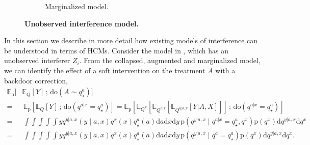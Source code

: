\documentclass[12pt]{article}
\newcommand{\rmdo}{\mathrm{do}}
\newcommand{\s}{\, ; \,}
\newcommand{\di}{\mathrm{d}}
\newcommand{\pr}{\mathrm{p}}
\begin{document}
\begin{figure}[t!]
\begin{subfigure}[t]{0.27\textwidth}
\end{subfigure}
\begin{subfigure}[t]{0.27\textwidth}
\caption{Marginalized model.} \label{fig:interfere_unobserve_marginalize}
\centering
{}
\end{subfigure}

\caption{\textbf{Unobserved interference model.}} \label{fig:interfere_unobserve}
\end{figure} 
In this section we describe in more detail how existing models of interference can be understood in terms of HCMs.
Consider the model in , which has an unobserved interferer $Z_i$. 
From the collapsed, augmented and marginalized model, we can identify the effect of a soft intervention on the treatment $A$ with a backdoor correction,
\begin{equation} \label{eqn:unobserve_interfere}
\begin{split}
	\mathbb{E}_\pr[&\mathbb{E}_Q[Y] \s \rmdo(A \sim q_\star^{a})] \\
	=&\, \mathbb{E}_\pr[\mathbb{E}_Q[Y] \s \rmdo(q^{a|x} = q_\star^{a})] = \mathbb{E}_\pr[\mathbb{E}_{Q^x}[\mathbb{E}_{Q^{a|x}}[\mathbb{E}_{Q^{y|a,x}}[Y|A,X]]]\s \rmdo(q^{a|x} = q_\star^{a})]\\
	=&\, \int\int\int \int \int y q^{y|a,x}(y\mid a, x) q^x(x) q^a_\star(a) \di a \di x \di y\,  \pr(q^{y|a,x} \mid q^{a|x} = q_\star^{a}, q^x) \pr(q^x) \di q^{y|a,x} \di q^x\\
	=&\, \int\int\int \int \int y q^{y|a,x}(y\mid a, x) q^x(x) q^a_\star(a) \di a \di x \di y\,  \pr(q^{y|a,x} \mid q^{a} = q_\star^{a}) \pr(q^x) \di q^{y|a,x} \di q^x.
\end{split}
\end{equation}
\end{document}
